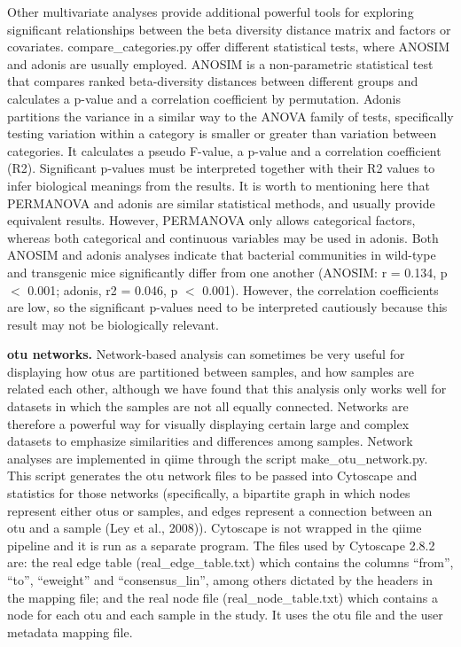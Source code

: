 Other multivariate analyses provide additional powerful tools for exploring significant
relationships between the beta diversity distance matrix and factors or covariates.
compare\_categories.py offer different statistical tests, where ANOSIM and adonis are
usually employed. ANOSIM is a non-parametric statistical test that compares ranked
beta-diversity distances between different groups and calculates a p-value and a correlation
coefficient by permutation. Adonis partitions the variance in a similar way to the
ANOVA family of tests, specifically testing variation within a category is smaller
or greater than variation between categories. It calculates a pseudo F-value, a
p-value and a correlation coefficient (R2). Significant p-values must be
interpreted together with their R2 values to infer biological meanings from the results.
It is worth to mentioning here that PERMANOVA and adonis are similar statistical methods,
and usually provide equivalent results. However, PERMANOVA only allows categorical factors,
whereas both categorical and continuous variables may be used in adonis. Both ANOSIM and
adonis analyses indicate that bacterial communities in wild-type and transgenic mice
significantly differ from one another (ANOSIM: r = 0.134, p $<$ 0.001; adonis, r2 = 0.046, p $<$ 0.001).
However, the correlation coefficients are low, so the significant p-values need to be
interpreted cautiously because this result may not be biologically relevant.


\textbf{\gls{otu} networks.} Network-based analysis can sometimes be very useful for
displaying how \gls{otu}s are partitioned between samples, and how samples are related
each other, although we have found that this analysis only works well for datasets
in which the samples are not all equally connected. Networks are therefore a powerful
way for visually displaying certain large and complex datasets to emphasize similarities
and differences among samples. Network analyses are implemented in \gls{qiime} through the
script make\_otu\_network.py. This script generates the \gls{otu} network files to be
passed into Cytoscape \cite{Shannon2003} and statistics for those networks (specifically,
a bipartite graph in which nodes represent either \gls{otu}s or samples, and edges represent
a connection between an \gls{otu} and a sample (Ley et al., 2008)). Cytoscape is not wrapped
in the \gls{qiime} pipeline and it is run as a separate program. The files used by Cytoscape 2.8.2 are:
the real edge table (real\_edge\_table.txt) which contains the columns “from”, “to”, “eweight” and
“consensus\_lin”, among others dictated by the headers in the mapping file; and the real
node file (real\_node\_table.txt) which contains a node for each \gls{otu} and each sample in
the study. It uses the \gls{otu} file and the user metadata mapping file.

